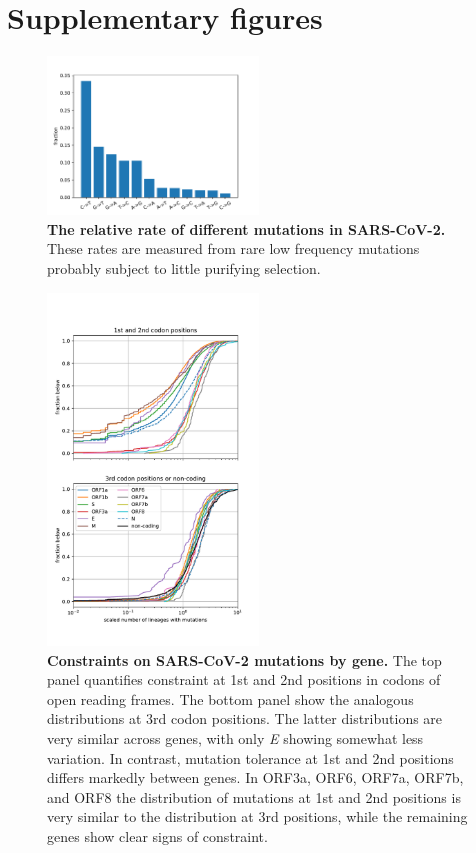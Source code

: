 \section*{Supplementary figures}

\setcounter{figure}{0}
\renewcommand{\figurename}{Figure S}
\setcounter{table}{0}
\renewcommand{\tablename}{Table S}


\begin{figure}[h]
    \includegraphics[width=0.5\textwidth]{figures/mutation_distribution.pdf}
    \caption{{\bf The relative rate of different mutations in SARS-CoV-2.}
    These rates are measured from rare low frequency mutations probably subject to little purifying selection.
    \label{fig:mutation_distribution}}
\end{figure}

\begin{figure}[h]
    \includegraphics[width=0.5\textwidth]{figures/fitness_cost_by_gene.pdf}
    \caption{{\bf Constraints on SARS-CoV-2 mutations by gene.}
    The top panel quantifies constraint at 1st and 2nd positions in codons of open reading frames.
    The bottom panel show the analogous distributions at 3rd codon positions.
    The latter distributions are very similar across genes, with only \emph{E} showing somewhat less variation.
    In contrast, mutation tolerance at 1st and 2nd positions differs markedly between genes.
    In ORF3a, ORF6, ORF7a, ORF7b, and ORF8 the distribution of mutations at 1st and 2nd positions is very similar to the distribution at 3rd positions, while the remaining genes show clear signs of constraint.
    \label{fig:fitness_costs_supp}}
 \end{figure}


